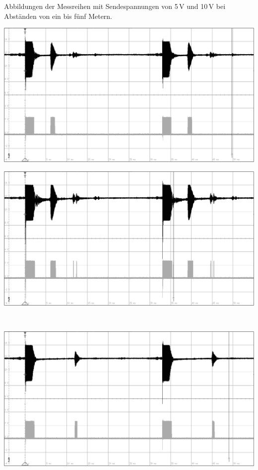 Abbildungen der Messreihen mit Sendespannungen von 5\,V und 10\,V bei Abständen von ein bis fünf Metern.\\
\begin{minipage}{0.46\textwidth}
\includegraphics[width=1\textwidth%
]{Abbildungen/MessungenP2/5V/1m.PNG}
\end{minipage}\qquad
\begin{minipage}{0.46\textwidth}
\includegraphics[width=1\textwidth%
]{Abbildungen/MessungenP2/10V/1m.PNG}
\end{minipage}\\
\begin{minipage}{0.46\textwidth}
\includegraphics[width=1\textwidth%
]{Abbildungen/MessungenP2/5V/2m.PNG}
\end{minipage}\qquad
